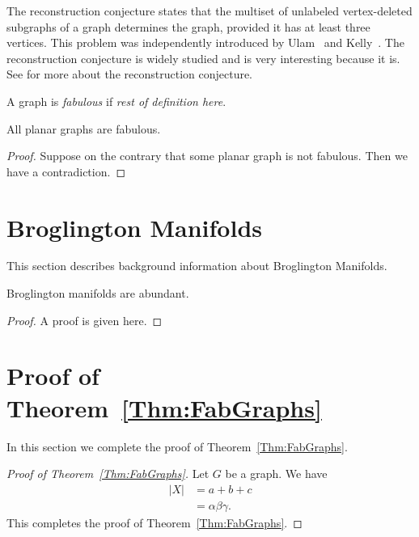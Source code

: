 \documentclass[12pt]{article}
\begin{document}
The reconstruction conjecture states that the multiset of unlabeled
vertex-deleted subgraphs of a graph determines the graph, provided it
has at least three vertices.  This problem was independently introduced
by Ulam~\cite{Ulam} and Kelly~\cite{Kelly}.  The reconstruction
conjecture is widely studied
\cite{Bollobas,FGH,HHRT,KSU,WS} and is very interesting
because it is. See \cite{BH} for more about the
reconstruction conjecture.

\begin{definition} 
  A graph is \emph{fabulous} if \emph{rest of definition here}.
\end{definition}

\begin{theorem}\label{Thm:FabGraphs}
  All planar graphs are fabulous.
\end{theorem}

\begin{proof}
  Suppose on the contrary that some planar graph is not fabulous.
  Then we have a contradiction.
\end{proof}


\section{Broglington Manifolds}

This section describes background information about Broglington
Manifolds.

\begin{lemma}\label{lem:Technical}
  Broglington manifolds are abundant.
\end{lemma}

\begin{proof}
  A proof is given here.
\end{proof}


\section{Proof of Theorem~\ref{Thm:FabGraphs}}

In this section we complete the proof of Theorem~\ref{Thm:FabGraphs}.

\begin{proof}[Proof of Theorem~\ref{Thm:FabGraphs}]
Let $G$ be a graph. We have
  \begin{align}
    |X| &= a+b+c \nonumber\\
         &= \alpha\beta\gamma.
  \end{align}
  This completes the proof of Theorem~\ref{Thm:FabGraphs}.
\end{proof}
\end{document}
